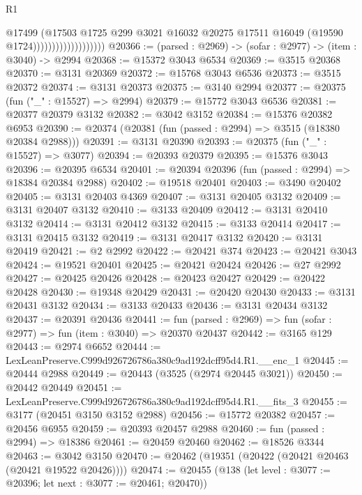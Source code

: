 \begin{lexlean}{R1}
\begin{coremodule}
                                      @17499
                                      (@17503
                                        @1725
                                        @299
                                        @3021
                                        @16032
                                        @20275
                                        @17511
                                        @16049
                                        (@19590 @1724)))))))))))))))))))
@20366 := (parsed : @2969) -> (sofar : @2977) -> (item : @3040) -> @2994
@20368 := @15372 @3043 @6534
@20369 := @3515 @20368
@20370 := @3131 @20369
@20372 := @15768 @3043 @6536
@20373 := @3515 @20372
@20374 := @3131 @20373
@20375 := @3140 @2994
@20377 := @20375 (fun ("_" : @15527) => @2994)
@20379 := @15772 @3043 @6536
@20381 := @20377 @20379 @3132
@20382 := @3042 @3152
@20384 := @15376 @20382 @6953
@20390 := @20374 (@20381 (fun (passed : @2994) => @3515 (@18380 @20384 @2988)))
@20391 := @3131 @20390
@20393 := @20375 (fun ("_" : @15527) => @3077)
@20394 := @20393 @20379
@20395 := @15376 @3043
@20396 := @20395 @6534
@20401 := @20394 @20396 (fun (passed : @2994) => @18384 @20384 @2988)
@20402 := @19518 @20401
@20403 := @3490 @20402
@20405 := @3131 @20403 @4369
@20407 := @3131 @20405 @3132
@20409 := @3131 @20407 @3132
@20410 := @3133 @20409
@20412 := @3131 @20410 @3132
@20414 := @3131 @20412 @3132
@20415 := @3133 @20414
@20417 := @3131 @20415 @3132
@20419 := @3131 @20417 @3132
@20420 := @3131 @20419
@20421 := @2 @2992
@20422 := @20421 @374
@20423 := @20421 @3043
@20424 := @19521 @20401
@20425 := @20421 @20424
@20426 := @27 @2992
@20427 := @20425 @20426
@20428 := @20423 @20427
@20429 := @20422 @20428
@20430 := @19348 @20429
@20431 := @20420 @20430
@20433 := @3131 @20431 @3132
@20434 := @3133 @20433
@20436 := @3131 @20434 @3132
@20437 := @20391 @20436
@20441 := fun (parsed : @2969) => fun (sofar : @2977) => fun (item : @3040) => @20370 @20437
@20442 := @3165 @129
@20443 := @2974 @6652
@20444 := LexLeanPreserve.C999d926726786a380c9ad192dcff95d4.R1.__enc_1
@20445 := @20444 @2988
@20449 := @20443 (@3525 (@2974 @20445 @3021))
@20450 := @20442 @20449
@20451 := LexLeanPreserve.C999d926726786a380c9ad192dcff95d4.R1.__fits_3
@20455 := @3177 (@20451 @3150 @3152 @2988)
@20456 := @15772 @20382
@20457 := @20456 @6955
@20459 := @20393 @20457 @2988
@20460 := fun (passed : @2994) => @18386
@20461 := @20459 @20460
@20462 := @18526 @3344
@20463 := @3042 @3150
@20470 := @20462 (@19351 (@20422 (@20421 @20463 (@20421 @19522 @20426))))
@20474 := @20455 (@138 (let level : @3077 := @20396; let next : @3077 := @20461; @20470))

\end{coremodule}
\end{lexlean}
